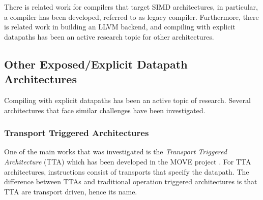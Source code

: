 



There is related work for compilers that target SIMD architectures, in particular, a compiler has been developed, referred to as legacy compiler. Furthermore, there is related work in building an LLVM backend, and compiling with explicit datapaths has been an active research topic for other architectures.


\subsection{Other Exposed/Explicit Datapath Architectures}\label{sec:other_explicit_datapaths}
Compiling with explicit datapaths has been an active topic of research. Several architectures that face similar challenges have been investigated. 


\subsubsection{Transport Triggered Architectures}\label{sec:tta}
One of the main works that was investigated is the  \emph{Transport Triggered Architecture} (TTA) which has been developed in the MOVE project \cite{tta_codegen}. For TTA architectures, instructions consist of transports that specify the datapath. The difference between TTAs and traditional operation triggered architectures is that TTA are transport driven, hence its name. 


